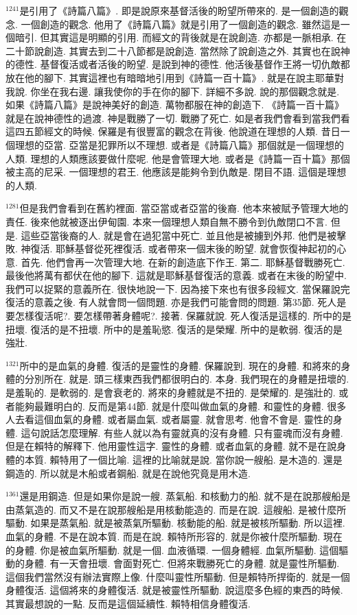 \documentclass{book}
\begin{document}
$^{1241}$是引用了《詩篇八篇》.
即是說原來基督活後的盼望所帶來的.
是一個創造的觀念.
一個創造的觀念.
他用了《詩篇八篇》就是引用了一個創造的觀念.
雖然這是一個暗引.
但其實這是明顯的引用.
而經文的背後就是在說創造.
亦都是一脈相承.
在二十節說創造.
其實去到二十八節都是說創造.
當然除了說創造之外.
其實也在說神的德性.
基督復活或者活後的盼望.
是說到神的德性.
他活後基督作王將一切仇敵都放在他的腳下.
其實這裡也有暗暗地引用到《詩篇一百十篇》.
就是在說主耶華對我說.
你坐在我右邊.
讓我使你的手在你的腳下.
詳細不多說.
說的那個觀念就是.
如果《詩篇八篇》是說神美好的創造.
萬物都服在神的創造下.
《詩篇一百十篇》就是在說神德性的過渡.
神是戰勝了一切.
戰勝了死亡.
如是者我們會看到當我們看這四五節經文的時候.
保羅是有很豐富的觀念在背後.
他說道在理想的人類.
昔日一個理想的亞當.
亞當是犯罪所以不理想.
或者是《詩篇八篇》那個就是一個理想的人類.
理想的人類應該要做什麼呢.
他是會管理大地.
或者是《詩篇一百十篇》那個被主高的尼采.
一個理想的君王.
他應該是能夠令到仇敵是.
閉目不語.
這個是理想的人類.

$^{1281}$但是我們會看到在舊約裡面.
當亞當或者亞當的後裔.
他本來被賦予管理大地的責任.
後來他就被逐出伊甸園.
本來一個理想人類自無不勝令到仇敵閉口不言.
但是.
這些亞當後裔的人.
就是會在過犯當中死亡.
並且他是被擄到外邦.
他們是被擊敗.
神復活.
耶穌基督從死裡復活.
或者帶來一個末後的盼望.
就會恢復神起初的心意.
首先.
他們會再一次管理大地.
在新的創造底下作王.
第二.
耶穌基督戰勝死亡.
最後他將萬有都伏在他的腳下.
這就是耶穌基督復活的意義.
或者在末後的盼望中.
我們可以捉緊的意義所在.
很快地說一下.
因為接下來也有很多段經文.
當保羅說完復活的意義之後.
有人就會問一個問題.
亦是我們可能會問的問題.
第35節.
死人是要怎樣復活呢?.
要怎樣帶著身體呢?.
接著.
保羅就說.
死人復活是這樣的.
所中的是扭壞.
復活的是不扭壞.
所中的是羞恥慾.
復活的是榮耀.
所中的是軟弱.
復活的是強壯.

$^{1321}$所中的是血氣的身體.
復活的是靈性的身體.
保羅說到.
現在的身體.
和將來的身體的分別所在.
就是.
頭三樣東西我們都很明白的.
本身.
我們現在的身體是扭壞的.
是羞恥的.
是軟弱的.
是會衰老的.
將來的身體就是不扭的.
是榮耀的.
是強壯的.
或者能夠最難明白的.
反而是第44節.
就是什麼叫做血氣的身體.
和靈性的身體.
很多人去看這個血氣的身體.
或者屬血氣.
或者屬靈.
就會思考.
他會不會是.
靈性的身體.
這句說話怎麼理解.
有些人就以為有靈就真的沒有身體.
只有靈魂而沒有身體.
但是在賴特的解釋下.
他用靈性這字.
靈性的身體.
或者血氣的身體.
就不是在說身體的本質.
賴特用了一個比喻.
這裡的比喻就是說.
當你說一艘船.
是木造的.
還是鋼造的.
所以就是木船或者鋼船.
就是在說他究竟是用木造.

$^{1361}$還是用鋼造.
但是如果你是說一艘.
蒸氣船.
和核動力的船.
就不是在說那艘船是由蒸氣造的.
而又不是在說那艘船是用核動能造的.
而是在說.
這艘船.
是被什麼所驅動.
如果是蒸氣船.
就是被蒸氣所驅動.
核動能的船.
就是被核所驅動.
所以這裡.
血氣的身體.
不是在說本質.
而是在說.
賴特所形容的.
就是你被什麼所驅動.
現在的身體.
你是被血氣所驅動.
就是一個.
血液循環.
一個身體經.
血氣所驅動.
這個驅動的身體.
有一天會扭壞.
會面對死亡.
但將來戰勝死亡的身體.
就是靈性所驅動.
這個我們當然沒有辦法實際上像.
什麼叫靈性所驅動.
但是賴特所捍衛的.
就是一個身體復活.
這個將來的身體復活.
就是被靈性所驅動.
說這麼多色經的東西的時候.
其實最想說的一點.
反而是這個延續性.
賴特相信身體復活.
\end{document}

